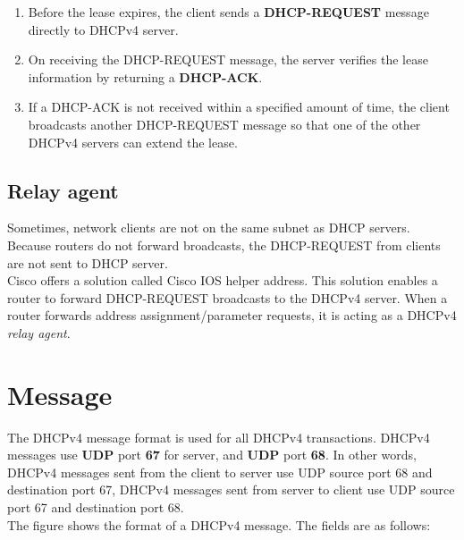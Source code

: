 \begin{enumerate}
\item Before the lease expires, the client sends a \textbf{DHCP-REQUEST} message directly to DHCPv4 server. 

\item On receiving the DHCP-REQUEST message, the server verifies the lease information by returning a \textbf{DHCP-ACK}.

\item If a DHCP-ACK is not received within a specified amount of time, the client broadcasts another DHCP-REQUEST message so that one of the other DHCPv4 servers can extend the lease.
\end{enumerate}

\subsection{Relay agent}

Sometimes, network clients are not on the same subnet as DHCP servers. Because routers do not forward broadcasts, the DHCP-REQUEST from clients are not sent to DHCP server.\\

Cisco offers a solution called Cisco IOS helper address. This solution enables a router to forward DHCP-REQUEST broadcasts to the DHCPv4 server. When
a router forwards address assignment/parameter requests, it is acting as a DHCPv4 \emph{relay agent}.

\section{Message}

The DHCPv4 message format is used for all DHCPv4 transactions. DHCPv4 messages use \textbf{UDP} port \textbf{67} for server, and \textbf{UDP} port \textbf{68}. In other words, DHCPv4 messages sent from the client to server use UDP source port 68 and destination port 67, DHCPv4 messages sent from server to client use UDP source port 67 and destination port 68. \\

The figure shows the format of a DHCPv4 message. The fields are as follows:

